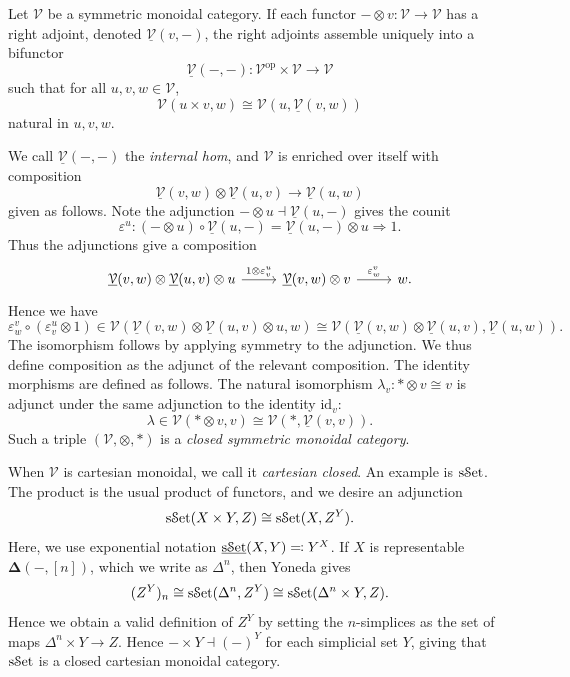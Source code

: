 \begin{definition}\label{dfn:3.2}
	Let $\mathcal{V} $ be a symmetric monoidal category. If each functor $-\otimes v : \mathcal{V}  \to \mathcal{V} $ has a right adjoint, denoted $\underline{\mathcal{V} }(v,-)$, the right adjoints assemble uniquely into a bifunctor
	\[
		\underline{\mathcal{V} }(-,-): \mathcal{V} ^{\mathrm{op}} \times  \mathcal{V}  \to \mathcal{V} 
	\]
	such that for all $u,v,w\in \mathcal{V} $,
	\[
		\mathcal{V} (u\times v,w)\cong \mathcal{V} (u,\underline{\mathcal{V} }(v,w))
	\]
	natural in $u,v,w$.

	We call $\underline{\mathcal{V} }(-,-)$ the \emph{internal hom}, and $\mathcal{V} $ is enriched over itself with composition
	\[
		\underline{\mathcal{V} }(v,w)\otimes \underline{\mathcal{V} }(u,v)\to \underline{\mathcal{V} }(u,w)
	\]
	given as follows. Note the adjunction $-\otimes u\dashv \underline{\mathcal{V} }(u,-)$ gives the counit
	\[
		\varepsilon^u : (-\otimes u)\circ \underline{\mathcal{V} }(u,-)=\underline{\mathcal{V} }(u,-)\otimes u \Rightarrow 1
	.\]
	Thus the adjunctions give a composition
	\[\begin{tikzcd}[row sep = 2.5em, column sep = 2.5em]
		\underline{\mathcal{V} }(v,w)\otimes \underline{\mathcal{V} }(u,v)\otimes u\ar[" 1\otimes \varepsilon _v^u ", r]  & \underline{\mathcal{V} }(v,w)\otimes v\ar[" \varepsilon _w^v ", r]  & w.
	\end{tikzcd}\]
	Hence we have
	\[
		\varepsilon _w^v\circ (\varepsilon _v^u \otimes 1)\in \mathcal{V} \left( \underline{\mathcal{V} }(v,w)\otimes \underline{\mathcal{V} }(u,v)\otimes u,w \right) \cong \mathcal{V} \left( \underline{\mathcal{V} }(v,w)\otimes \underline{\mathcal{V} }(u,v),\underline{\mathcal{V} }(u,w) \right) 
	.\]
	The isomorphism follows by applying symmetry to the adjunction. We thus define composition as the adjunct of the relevant composition. The identity morphisms are defined as follows. The natural isomorphism $\lambda_v : *\otimes v \cong v$ is adjunct under the same adjunction to the identity $\mathrm{id}_v$:
	\[
		\lambda\in \mathcal{V} (*\otimes v,v)\cong \mathcal{V} (*,\underline{\mathcal{V} }(v,v))
	.\]
	Such a triple $(\mathcal{V} ,\otimes,*)$ is a \emph{closed symmetric monoidal category}.
\end{definition}

When $\mathcal{V} $ is cartesian monoidal, we call it \emph{cartesian closed}. An example is $\mathrm{s}\mathcal{S}\mathrm{et}$. The product is the usual product of functors, and we desire an adjunction
\[
	\mathrm{s}\mathcal{S}\mathrm{et}(X\times Y,Z)\cong\mathrm{s}\mathcal{S}\mathrm{et}(X,Z^Y)
.\]
Here, we use exponential notation $\underline{\mathrm{s}\mathcal{S}\mathrm{et}}(X,Y)\eqqcolon Y^X$. If $X$ is representable $\boldsymbol{\Delta} (-,[n])$, which we write as $\Delta^n$, then Yoneda gives
\[
	(Z^Y)_n\cong\mathrm{s}\mathcal{S}\mathrm{et}(\Delta^n, Z^Y)\cong\mathrm{s}\mathcal{S}\mathrm{et}(\Delta^n\times Y,Z)
.\]
Hence we obtain a valid definition of $Z^Y$ by setting the $n$-simplices as the set of maps $\Delta^n\times Y\to Z$. Hence $-\times Y\dashv (-)^Y$ for each simplicial set $Y$, giving that $\mathrm{s}\mathcal{S}\mathrm{et}$ is a closed cartesian monoidal category.

